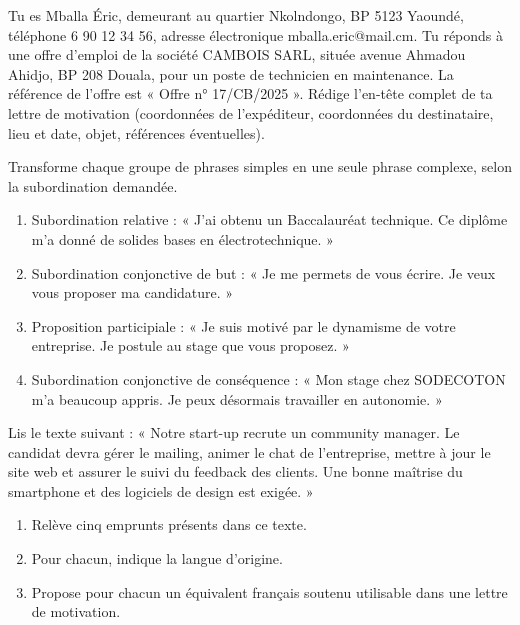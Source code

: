 \documentclass[11pt]{article}
\newcounter{popsec}
\newcounter{popsub}
\newcommand{\courssub}[1]{%
  \stepcounter{popsub}%
  \par\vspace{9pt}\noindent{\popxbold\fontsize{11.5}{13}\selectfont\color{popink}{\color{poporange}\thepopsec.\thepopsub}\hspace{6pt}#1}\par\nopagebreak\vspace{4pt}
}
\begin{document}
\courssub{Je m'entraîne}

\begin{exercice}
Tu es Mballa Éric, demeurant au quartier Nkolndongo, BP 5123 Yaoundé, téléphone 6 90 12 34 56, adresse électronique mballa.eric@mail.cm. Tu réponds à une offre d'emploi de la société CAMBOIS SARL, située avenue Ahmadou Ahidjo, BP 208 Douala, pour un poste de technicien en maintenance. La référence de l'offre est « Offre n° 17/CB/2025 ». Rédige l'en-tête complet de ta lettre de motivation (coordonnées de l'expéditeur, coordonnées du destinataire, lieu et date, objet, références éventuelles).
\end{exercice}

\begin{exercice}
Transforme chaque groupe de phrases simples en une seule phrase complexe, selon la subordination demandée.
\begin{enumerate}
\item Subordination relative : « J'ai obtenu un Baccalauréat technique. Ce diplôme m'a donné de solides bases en électrotechnique. »
\item Subordination conjonctive de but : « Je me permets de vous écrire. Je veux vous proposer ma candidature. »
\item Proposition participiale : « Je suis motivé par le dynamisme de votre entreprise. Je postule au stage que vous proposez. »
\item Subordination conjonctive de conséquence : « Mon stage chez SODECOTON m'a beaucoup appris. Je peux désormais travailler en autonomie. »
\end{enumerate}
\end{exercice}

\begin{exercice}
Lis le texte suivant : « Notre start-up recrute un community manager. Le candidat devra gérer le mailing, animer le chat de l'entreprise, mettre à jour le site web et assurer le suivi du feedback des clients. Une bonne maîtrise du smartphone et des logiciels de design est exigée. »
\begin{enumerate}
\item Relève cinq emprunts présents dans ce texte.
\item Pour chacun, indique la langue d'origine.
\item Propose pour chacun un équivalent français soutenu utilisable dans une lettre de motivation.
\end{enumerate}
\end{exercice}
\end{document}
